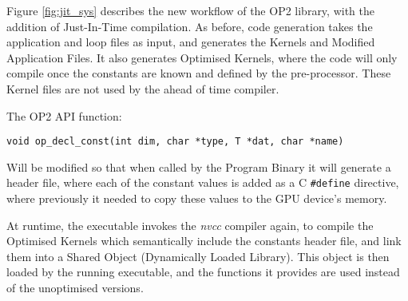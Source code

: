 Figure \ref{fig:jit_sys} describes the new workflow of the OP2 library, with the addition of Just-In-Time compilation. As before, code generation takes the application and loop files as input, and generates the Kernels and Modified Application Files. It also generates Optimised Kernels, where the code will only compile once the constants are known and defined by the pre-processor. These Kernel files are not used by the ahead of time compiler.

The OP2 API function:
\begin{center}
\lstinline{void op_decl_const(int dim, char *type, T *dat, char *name)}
\\\vspace{-1em}
\hspace*{\fill}\cite[p9]{manual}
\end{center}
\vspace{-1em}
Will be modified so that when called by the Program Binary it will generate a header file, where each of the constant values is added as a C \verb|#define| directive, where previously it needed to copy these values to the GPU device's memory.
\par At runtime, the executable invokes the \textit{nvcc} compiler again, to compile the Optimised Kernels which semantically include the constants header file, and link them into a Shared Object (Dynamically Loaded Library). This object is then loaded by the running executable, and the functions it provides are used instead of the unoptimised versions.
